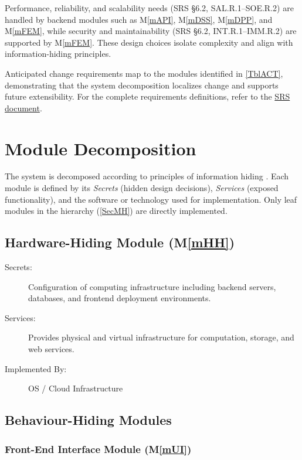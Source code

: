 \documentclass[12pt, titlepage]{article}
\newcommand{\mref}[1]{M\ref{#1}}
\begin{document}
Performance, reliability, and scalability needs (SRS §6.2, SAL.R.1--SOE.R.2) are handled by backend modules such as \mref{mAPI}, \mref{mDSS}, \mref{mDPP}, and \mref{mFEM}, while security and maintainability (SRS §6.2, INT.R.1--IMM.R.2) are supported by \mref{mFEM}. These design choices isolate complexity and align with information-hiding principles.

Anticipated change requirements map to the modules identified in \autoref{TblACT}, demonstrating that the system decomposition localizes change and supports future extensibility. For the complete requirements definitions, refer to the \href{https://github.com/OCD-Rats-Capstone/OCD-Rat-Infrastructure/blob/main/docs/SRS-Volere/SRS.pdf}{SRS document}.

\section{Module Decomposition} \label{SecMD}

The system is decomposed according to principles of information hiding \citep{ParnasEtAl1984}. Each module is defined by its \textit{Secrets} (hidden design decisions), \textit{Services} (exposed functionality), and the software or technology used for implementation. Only leaf modules in the hierarchy (\autoref{SecMH}) are directly implemented.

\subsection{Hardware-Hiding Module (\mref{mHH})}

\begin{description}
\item[Secrets:] Configuration of computing infrastructure including backend servers, databases, and frontend deployment environments.
\item[Services:] Provides physical and virtual infrastructure for computation, storage, and web services.
\item[Implemented By:] OS / Cloud Infrastructure
\end{description}

\subsection{Behaviour-Hiding Modules}

\subsubsection{Front-End Interface Module (\mref{mUI})}
\end{document}
